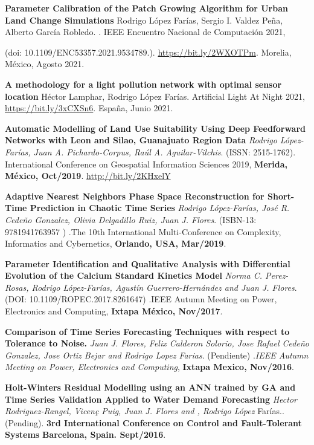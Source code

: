 \documentclass[10pt]{article}
\newenvironment{innerlist}[1][\enskip\textbullet]%
        {\begin{compactitem}[#1]}{\end{compactitem}}
\begin{document}
\begin{innerlist}

\item \textbf{Parameter Calibration of the Patch Growing Algorithm for Urban Land Change Simulations} Rodrigo López Farías, Sergio I. Valdez Peña, Alberto García Robledo. . IEEE Encuentro Nacional de Computación 2021, 

(doi: 10.1109/ENC53357.2021.9534789.).  \url{https://bit.ly/2WXOTPm}. Morelia, México, Agosto 2021.

\item \textbf{A methodology for a light pollution network with
optimal sensor location} Héctor Lamphar, Rodrigo López Farías. Artificial Light At Night 2021, \url{https://bit.ly/3xCXSn6}. España, Junio 2021.

\item \textbf{Automatic Modelling of Land Use Suitability Using Deep Feedforward Networks with Leon and
Silao, Guanajuato Region Data} \textit{Rodrigo López-Farías, Juan A. Pichardo-Corpus, Raúl A. Aguilar-Vilchis}. (ISSN: 2515-1762). {International Conference on Geospatial Information Sciences 2019}, \textbf{Merida, México, Oct/2019}. \url{http://bit.ly/2KHxelY}

\item \textbf{Adaptive Nearest Neighbors Phase Space Reconstruction for Short-Time Prediction in Chaotic Time Series} \textit{Rodrigo López-Farías, José R. Cedeño Gonzalez, Olivia Delgadillo Ruiz, Juan J. Flores}. (ISBN-13: 9781941763957 ) .{The 10th International Multi-Conference on Complexity, Informatics and Cybernetics}, \textbf{Orlando, USA, Mar/2019}.


\item \textbf{Parameter Identification and Qualitative Analysis with Differential Evolution of the Calcium Standard Kinetics Model} \textit{Norma C. Perez-Rosas, Rodrigo López-Farías, Agustín Guerrero-Hernández and Juan J. Flores}. (DOI: 10.1109/ROPEC.2017.8261647) .{IEEE Autumn Meeting on Power, Electronics and Computing}, \textbf{Ixtapa México, Nov/2017}.


\item \textbf{Comparison of Time Series Forecasting Techniques with respect to Tolerance to Noise.} \textit{Juan J. Flores, Felix Calderon Solorio, Jose Rafael Cede\~no Gonzalez, Jose Ortiz Bejar and Rodrigo Lopez Farias}. (Pendiente) .\textit{IEEE Autumn Meeting on Power, Electronics and Computing}, \textbf{Ixtapa Mexico, Nov/2016}.


\item \textbf{Holt-Winters Residual Modelling using an ANN trained by GA and Time Series Validation Applied to Water Demand Forecasting} \textit{Hector Rodriguez-Rangel, Vicen\c{c} Puig, Juan J. Flores and ,  Rodrigo López} Farías.. (Pending). \textbf{3rd International Conference on Control and Fault-Tolerant Systems} \textbf{Barcelona, Spain. Sept/2016}.


\end{innerlist}
\end{document}
